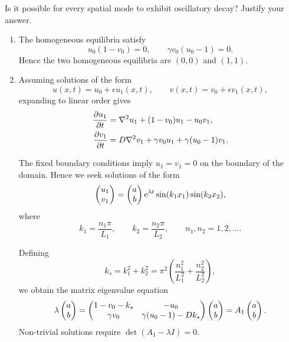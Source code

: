 \documentclass[a4paper,12pt]{article}
\begin{document}
\begin{enumerate}
{\begin{enumerate}[label=(\alph*)]
            Is it possible for every spatial mode to exhibit
            oscillatory decay? Justify your answer.
        \end{enumerate}
    }
    { %
        \begin{enumerate}[label=(\alph*)]
            \item The homogeneous equilibria satisfy
            \begin{equation*}
                u_0(1-v_0)=0,
                \qquad
                \gamma v_0(u_0-1)=0.
            \end{equation*}
            Hence the two homogeneous equilibria are $(0,0)$ and
            $(1,1)$.

            \item Assuming solutions of the form
            \begin{equation*}
                u(x,t)=u_0+\epsilon u_1(x,t),
                \qquad
                v(x,t)=v_0+\epsilon v_1(x,t),
            \end{equation*}
            expanding to linear order gives
            \begin{align*}
                \pd{u_1}{t}
                &= \nabla^2 u_1+(1-v_0)u_1-u_0v_1,\\
                \pd{v_1}{t}
                &= D\nabla^2 v_1+\gamma v_0u_1
                +\gamma(u_0-1)v_1.
            \end{align*}

            The fixed boundary conditions imply $u_1=v_1=0$
            on the boundary of the domain. Hence we seek solutions
            of the form
            \begin{equation*}
                \begin{pmatrix}u_1\\v_1\end{pmatrix}=
                \begin{pmatrix}a\\b\end{pmatrix}\mathrm{e}^{\lambda t}
                \sin(k_1x_1)\sin(k_2x_2),
            \end{equation*}
            where
            \begin{equation*}
                k_1=\frac{n_1\pi}{L_1},
                \qquad
                k_2=\frac{n_2\pi}{L_2},
                \qquad
                n_1,n_2=1,2,\ldots.
            \end{equation*}

            Defining
            \begin{equation*}
                k_s=k_1^2+k_2^2=
                \pi^2\left(\frac{n_1^2}{L_1^2}
                +\frac{n_2^2}{L_2^2}\right),
            \end{equation*}
            we obtain the matrix eigenvalue equation
            \begin{equation*}
                \lambda\begin{pmatrix}a\\b\end{pmatrix}=
                \begin{pmatrix}1-v_0-k_s&-u_0\\\gamma v_0&\gamma(u_0-1)-Dk_s\end{pmatrix}
                \begin{pmatrix}a\\b\end{pmatrix}
                =A_1\begin{pmatrix}a\\b\end{pmatrix}.
            \end{equation*}
            Non-trivial solutions require
            $\det(A_1-\lambda I)=0$.


\end{enumerate}}
\end{enumerate}
\end{document}
